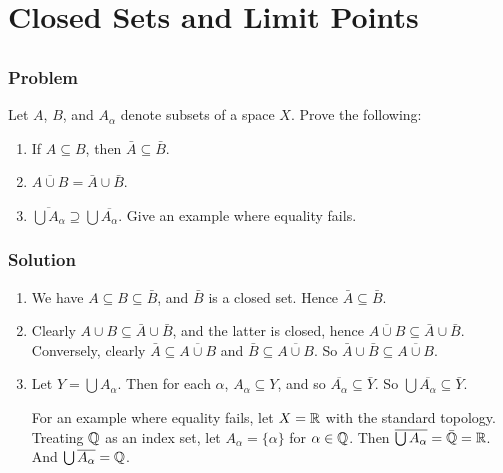\setcounter{section}{16} %
\section{Closed Sets and Limit Points}
\label{sec-topspace-closed}

\setcounter{subsection}{5} %
\subsection{}

\subsubsection{Problem}
Let $A$, $B$, and $A_\alpha$ denote subsets of a space $X$. Prove the following:
\begin{enumerate}
 \item If $A \subseteq B$, then $\bar{A} \subseteq \bar{B}$.
 \item $\overline{A \cup B} = \bar A \cup \bar B$.
 \item $\overline{\bigcup A_\alpha} \supseteq \bigcup \overline{A_\alpha}$. Give an example where equality fails.
\end{enumerate}
\subsubsection{Solution}
\begin{enumerate}
 \item We have $A \subseteq B \subseteq \bar B$, and $\bar B$ is a closed set. Hence $\bar A \subseteq \bar B$.
 \item Clearly $A \cup B \subseteq \bar A \cup \bar B$, and the latter is closed, hence $\overline{A \cup B} \subseteq \bar A \cup \bar B$. Conversely, clearly $\bar A \subseteq \overline{A \cup B}$ and $\bar B \subseteq \overline{A \cup B}$. So $\bar A \cup \bar B \subseteq \overline{A \cup B}$.
 \item Let $Y = \bigcup A_\alpha$. Then for each $\alpha$, $A_\alpha \subseteq Y$, and so $\overline{A_\alpha} \subseteq \bar Y$. So $\bigcup \overline{A_\alpha} \subseteq \bar Y$.
 
 For an example where equality fails, let $X = \mathbb R$ with the standard topology. Treating $\mathbb Q$ as an index set, let $A_\alpha = \{\alpha\}$ for $\alpha \in \mathbb Q$. Then $\overline{\bigcup A_\alpha} = \bar {\mathbb Q} = \mathbb R$. And $\bigcup \overline{A_\alpha} = \mathbb Q$.
 \end{enumerate}
 
